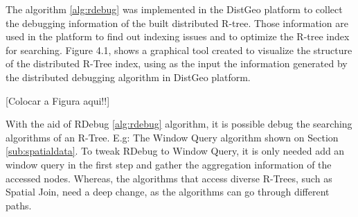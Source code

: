 The algorithm \ref{alg:rdebug} was implemented in the DistGeo platform to collect the debugging information of the built distributed R-tree. Those information are used in the platform to find out indexing issues and to optimize the R-tree index for searching. Figure 4.1, shows a graphical tool created to visualize the structure of the distributed R-Tree index, using as the input the information generated by the distributed debugging algorithm in DistGeo platform.

[Colocar a Figura aqui!!]

With the aid of RDebug \ref{alg:rdebug} algorithm, it is possible debug the searching algorithms of an R-Tree. E.g: The Window Query algorithm shown on Section \ref{sub:spatialdata}. To tweak RDebug to Window Query, it is only needed add an window query in the first step and gather the aggregation information of the accessed nodes. Whereas, the algorithms that access diverse R-Trees, such as Spatial Join, need a deep change, as the algorithms can go through different paths.